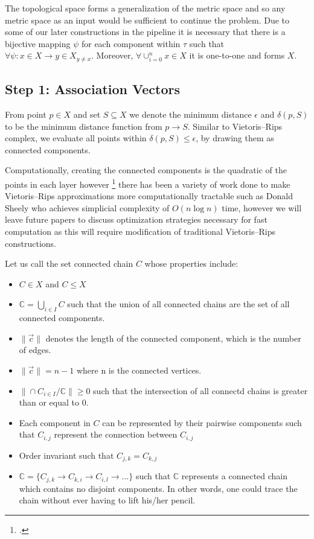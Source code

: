 The topological space forms a generalization of the metric space and so any metric space as an input would be sufficient to continue the problem. Due to some of our later constructions in the pipeline it is necessary that there is a bijective mapping $\psi$ for each component within $\tau$ such that $\forall \psi: x \in X \rightarrow y \in X_{y \neq x}$. Moreover, $\forall \cup_{i=0}^n x \in X$ it is one-to-one and forms $X$.   

\subsection{Step 1: Association Vectors}

From point $p \in X$ and set $S \subseteq X$ we denote the minimum distance $\epsilon$ and $\delta(p,S)$ to be the minimum distance function from $p \rightarrow S$. Similar to Vietoris–Rips complex, we evaluate all points within $\delta(p,S) \leq \epsilon$, by drawing them as connected components.

Computationally, creating the connected components is the quadratic of the points in each layer however \footcite{Piegl} there has been a variety of work done to make Vietoris–Rips approximations more computationally tractable such as Donald Sheely who achieves simplicial complexity of $O(n \log n)$ time, however we will leave future papers to discuss optimization strategies necessary for fast computation as this will require modification of traditional Vietoris–Rips constructions. 

Let us call the set connected chain $C$ whose properties include:
\begin{itemize}
\item $C \in X$ and $C \leq X$
\item $\mathbb{C} = \bigcup_{i \in I} C$ such that the union of all connected chains are the set of all connected components.
\item $\| \vec{c} \|$ denotes the length of the connected component, which is the number of edges.
\item $\| \vec{c} \| = n - 1$ where n is the connected vertices.
\item $\|\cap C_{i \in I} / \mathbb{C} \| \geq 0$ such that the intersection of all connectd chains is greater than or equal to 0. 
\item Each component in $C$ can be represented by their pairwise components such that $C_{i,j}$ represent the connection between $C_{i,j}$
\item Order invariant such that $C_{j,k} = C_{k,j}$ 
\item $\mathbb{C} = \{C_{j,k} \rightarrow C_{k,i} \rightarrow C_{i,l} \rightarrow ...\}$ such that $\mathbb{C}$ represents a connected chain which contains no disjoint components. In other words, one could trace the chain without ever having to lift his/her pencil.
\end{itemize}

